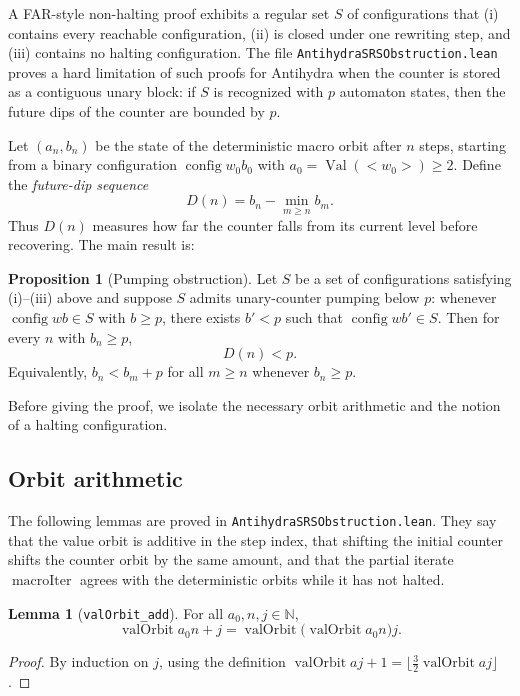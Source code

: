 \documentclass[11pt,a4paper]{article}
\theoremstyle{definition}
\newtheorem{lemma}[definition]{Lemma}
\newtheorem{proposition}[definition]{Proposition}
\newcommand{\lt}{<}
\newcommand{\gt}{>}
\newcommand{\Nat}{\mathbb{N}}
\newcommand{\val}{\operatorname{Val}}
\newcommand{\config}{\operatorname{config}}
\newcommand{\valOrbit}{\operatorname{valOrbit}}
\newcommand{\macroIter}{\operatorname{macroIter}}
\begin{document}
A FAR-style non-halting proof exhibits a regular set $S$ of configurations
that (i) contains every reachable configuration, (ii) is closed under one
rewriting step, and (iii) contains no halting configuration.  The file
\texttt{AntihydraSRSObstruction.lean} proves a hard limitation of such
proofs for Antihydra when the counter is stored as a contiguous unary
block: if $S$ is recognized with $p$ automaton states, then the future
dips of the counter are bounded by $p$.

Let $(a_n,b_n)$ be the state of the deterministic macro orbit after $n$
steps, starting from a binary configuration $\config{w_0}{b_0}$ with
$a_0=\val(\lt w_0\gt)\ge2$.  Define the \emph{future-dip sequence}
\begin{equation}
  \label{eq:future-dip}
  D(n)=b_n-\min_{m\ge n}b_m.
\end{equation}
Thus $D(n)$ measures how far the counter falls from its current level
before recovering.  The main result is:

\begin{proposition}[Pumping obstruction]
\label{prop:pumping-obstruction}
Let $S$ be a set of configurations satisfying \textup{(i)--(iii)} above
and suppose $S$ admits unary-counter pumping below $p$: whenever
$\config{w}{b}\in S$ with $b\ge p$, there exists $b'<p$ such that
$\config{w}{b'}\in S$.  Then for every $n$ with $b_n\ge p$,
\[
  D(n)<p.
\]
Equivalently, $b_n<b_m+p$ for all $m\ge n$ whenever $b_n\ge p$.
\end{proposition}

Before giving the proof, we isolate the necessary orbit arithmetic and the
notion of a halting configuration.

\subsection{Orbit arithmetic}

The following lemmas are proved in
\texttt{AntihydraSRSObstruction.lean}.  They say that the value orbit is
additive in the step index, that shifting the initial counter shifts the
counter orbit by the same amount, and that the partial iterate
$\macroIter$ agrees with the deterministic orbits while it has not halted.

\begin{lemma}[\texttt{valOrbit\_add}]
\label{lem:valOrbit-add}
For all $a_0,n,j\in\Nat$,
\[
  \valOrbit{a_0}{n+j}=\valOrbit{\bigl(\valOrbit{a_0}{n}\bigr)}{j}.
\]
\end{lemma}
\begin{proof}
By induction on $j$, using the definition
$\valOrbit{a}{j+1}=\bigl\lfloor\frac32\valOrbit{a}{j}\bigr\rfloor$.
\end{proof}
\end{document}
